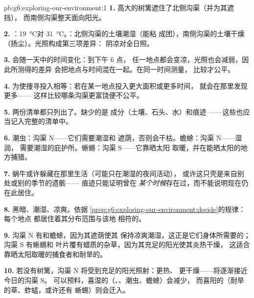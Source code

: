 \begin{solution}{pb:g6:exploring-our-environment:1}
\textbf{1.} 高大的树篱遮住了北侧沟渠（并为其遮挡），
而南侧沟渠整天面向阳光。

\textbf{2.} ：\qty{19}{\degreeCelsius}对
\qty{31}{\degreeCelsius}。：北侧沟渠的土壤潮湿（能粘
成团），南侧沟渠的土壤干燥（扬尘）。光照构成第三项差异：
阴凉对全日照。

\textbf{3.} 会随一天中的时间变化：到下午 6 点，
任一地点都会变凉，光照也会减弱，因此所测得的差异
会把地点与时间混在一起。在同一时间测量，
比较才公平。

\textbf{4.} 为使搜寻投入相等：若在某一地点投入更大面积或更多时间，
就会在那里发现更多——
这样比较哪条沟渠更富饶便不公平。

\textbf{5.} 两份清单都只列出了。缺少的是
成分（土壤、石头、水）和痕迹
——这些也应当记入完整的清单中。

\textbf{6.} 潮虫：沟渠 N——它们需要潮湿和
遮荫，否则会干枯。蟾蜍：沟渠 N——湿润，
需要潮湿的庇护所。蜥蜴：沟渠 S——它靠晒太阳
取暖，并在能晒太阳的地方捕猎。

\textbf{7.} 蜗牛或许躲藏在那里生活（可能只在潮湿的夜间活动），
或许这只壳是来自别处或别的季节的遗骸——
痕迹只能证明曾在
\emph{某个时候}存在过，而不能说明现在仍在此居住。

\textbf{8.} 黑暗、潮湿、凉爽。依据
\cref{prop:g6:exploring-our-environment:decide}的规律：每个地点
都居住着其分布范围与该地
相符的。

\textbf{9.} 沟渠 N 有和蟾蜍，因为其遮荫使其
保持凉爽潮湿，这正是它们身体所需要的；沟渠 S 有蜥蜴和
叶片覆有蜡质的杂草，因为其充足的阳光使其炎热干燥，
这适合靠晒太阳取暖的捕食者和耐旱的。

\textbf{10.} 若没有树篱，沟渠 N 将受到充足的阳光照射：更热、
更干燥——将逐渐接近今日的沟渠 S。
可以预料，喜湿的（、、潮虫、蟾蜍）会减少，
而喜阳的（耐旱的草、蚱蜢，或许还有
蜥蜴）则会迁入。


\end{solution}
